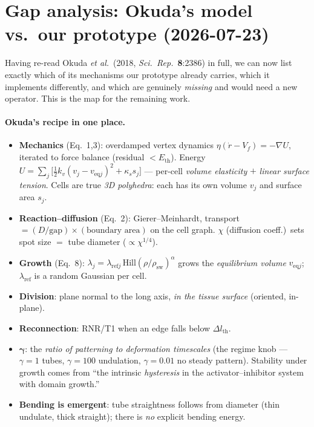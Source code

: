 \documentclass[11pt]{article}
\begin{document}
\section{Gap analysis: Okuda's model vs.\ our prototype (2026-07-23)}
Having re-read Okuda \emph{et al.}\ (2018, \emph{Sci.\ Rep.}\ \textbf{8}:2386) in full, we can now list
exactly which of its mechanisms our prototype already carries, which it implements differently, and which
are genuinely \emph{missing} and would need a new operator. This is the map for the remaining work.

\paragraph{Okuda's recipe in one place.}
\begin{itemize}\itemsep2pt
\item \textbf{Mechanics} (Eq.~1,3): overdamped vertex dynamics $\eta(\dot r - V_f)=-\nabla U$, iterated to
force balance (residual $<E_{\text{th}}$). Energy $U=\sum_j\big[\tfrac12 k_v(v_j-v_{\text{eq}j})^2+\kappa_s
s_j\big]$ --- per-cell \emph{volume elasticity} $+$ \emph{linear surface tension}. Cells are true \emph{3D
polyhedra}: each has its own volume $v_j$ and surface area $s_j$.
\item \textbf{Reaction--diffusion} (Eq.~2): Gierer--Meinhardt, transport $=(D/\text{gap})\times(\text{boundary
area})$ on the cell graph. $\chi$ (diffusion coeff.)\ sets spot size $=$ tube diameter ($\propto\chi^{1/4}$).
\item \textbf{Growth} (Eq.~8): $\lambda_j=\lambda_{\text{ref}j}\,\mathrm{Hill}(\rho/\rho_{\text{sw}})^\alpha$
grows the \emph{equilibrium volume} $v_{\text{eq}j}$; $\lambda_{\text{ref}}$ is a random Gaussian per cell.
\item \textbf{Division}: plane normal to the long axis, \emph{in the tissue surface} (oriented, in-plane).
\item \textbf{Reconnection}: RNR/T1 when an edge falls below $\Delta l_{\text{th}}$.
\item $\boldsymbol\gamma$: the \emph{ratio of patterning to deformation timescales} (the regime knob ---
$\gamma{=}1$ tubes, $\gamma{=}100$ undulation, $\gamma{=}0.01$ no steady pattern). Stability under growth
comes from ``the intrinsic \emph{hysteresis} in the activator--inhibitor system with domain growth.''
\item \textbf{Bending is emergent}: tube straightness follows from diameter (thin undulate, thick straight);
there is \emph{no} explicit bending energy.
\end{itemize}
\end{document}
